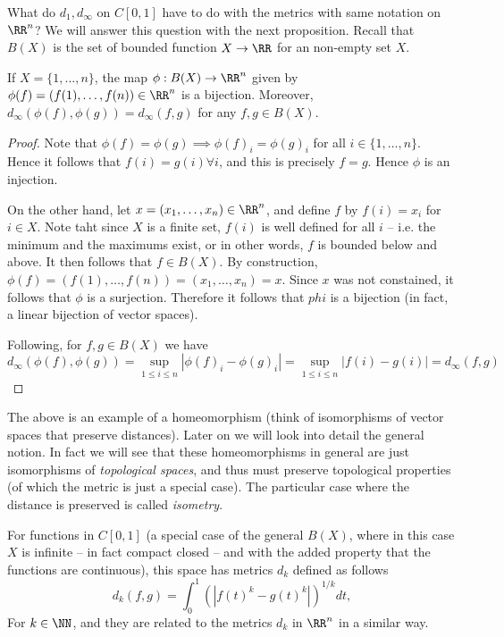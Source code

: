 What do $d_1,d_{\infty}$ on $C[0,1]$ have to do with the metrics with same
notation on $\RR^n$? We will answer this question with the next proposition.
Recall that $B(X)$ is the set of bounded function $X\to\RR$ for an non-empty set
$X$.
\begin{proposition}
  If $X=\{1,\dots, n\}$, the map $\phi:B(X)\to\RR^n$ given by
  $\phi(f)=(f(1),\dots,f(n))\in\RR^n$ is a bijection. Moreover,
  $d_{\infty}(\phi(f),\phi(g))= d_{\infty}(f,g)$ for any $f,g\in B(X)$.
  \label{<+label+>}
\end{proposition}
\begin{proof}
  Note that $\phi(f)=\phi(g)\implies \phi(f)_i=\phi(g)_i$ for all
  $i\in\{1,\dots,n\}$. Hence it follows that $f(i)=g(i)\forall i$, and this is
  precisely $f=g$. Hence $\phi$ is an injection.
  
  On the other hand, let $x=(x_1,\dots,x_n)\in\RR^n$, and define $f$ by
  $f(i)=x_i$ for $i\in X$. Note taht since $X$ is a finite set, $f(i)$ is well
  defined for all $i$ -- i.e. the minimum and the maximums exist, or in other
  words, $f$ is bounded below and above. It then follows that $f\in B(X)$. By
  construction, $\phi(f)=(f(1),\dots, f(n)) = (x_1,\dots, x_n)=x$. Since $x$ was
  not constained, it follows that $\phi$ is a surjection. Therefore it follows
  that $phi$ is a bijection (in fact, a linear bijection of vector spaces).

  Following, for $f,g\in B(X)$ we have
  \[d_{\infty}(\phi(f),\phi(g))= \sup_{1\leq i\leq n} |\phi(f)_i-\phi(g)_i|=
  \sup_{1\leq i \leq n} |f(i)-g(i)| = d_{\infty}(f,g)\]
\end{proof}
\begin{remark}
  The above is an example of a homeomorphism (think of isomorphisms of vector
  spaces that preserve distances). Later on we will look into detail the general
  notion. In fact we will see that these homeomorphisms in general are just
  isomorphisms of \emph{topological spaces}, and thus must preserve topological
  properties (of which the metric is just a special case). The particular case
  where the distance is preserved is called \emph{isometry}.
\end{remark}

For functions in $C[0,1]$ (a special case of the general $B(X)$, where in this
case $X$ is infinite -- in fact compact closed -- and with the added property
that the functions are continuous), this space has metrics $d_k$ defined as
follows
\[d_k(f,g)= \int_0^1\left( |f(t)^k - g(t)^k| \right)^{1/k} dt,\]
For $k\in\NN$, and they are related to the metrics $d_k$ in $\RR^n$ in a
similar way.

